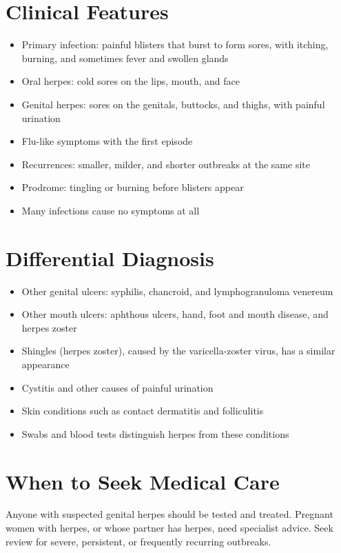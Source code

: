 \section*{Clinical Features}
\begin{itemize}
    \item Primary infection: painful blisters that burst to form sores, with itching, burning, and sometimes fever and swollen glands
    \item Oral herpes: cold sores on the lips, mouth, and face
    \item Genital herpes: sores on the genitals, buttocks, and thighs, with painful urination
    \item Flu-like symptoms with the first episode
    \item Recurrences: smaller, milder, and shorter outbreaks at the same site
    \item Prodrome: tingling or burning before blisters appear
    \item Many infections cause no symptoms at all
\end{itemize}

\section*{Differential Diagnosis}
\begin{itemize}
    \item Other genital ulcers: syphilis, chancroid, and lymphogranuloma venereum
    \item Other mouth ulcers: aphthous ulcers, hand, foot and mouth disease, and herpes zoster
    \item Shingles (herpes zoster), caused by the varicella-zoster virus, has a similar appearance
    \item Cystitis and other causes of painful urination
    \item Skin conditions such as contact dermatitis and folliculitis
    \item Swabs and blood tests distinguish herpes from these conditions
\end{itemize}

\section*{When to Seek Medical Care}
Anyone with suspected genital herpes should be tested and treated. Pregnant women with herpes, or whose partner has herpes, need specialist advice. Seek review for severe, persistent, or frequently recurring outbreaks.

